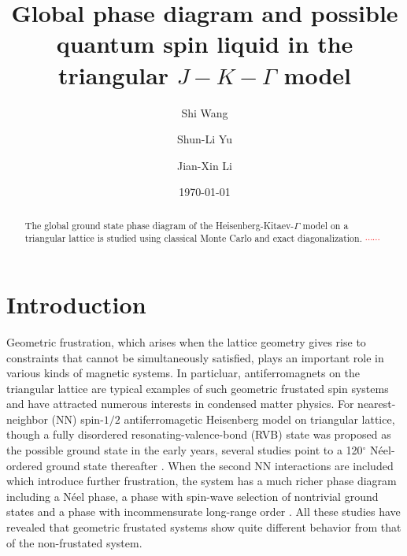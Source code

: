 \documentclass[aps,prb,reprint,groupedaddress,showpacs,amsfonts,amsmath,amssymb,superscriptaddress]{revtex4-1}
\begin{document}
\title{Global phase diagram and possible quantum spin liquid in the triangular $J-K-\Gamma$ model}

\author{Shi Wang}
\author{Shun-Li Yu}
\author{Jian-Xin Li}

\date{\today}

\begin{abstract}
    The global ground state phase diagram of the Heisenberg-Kitaev-$\Gamma$ model on a triangular lattice is studied using classical Monte Carlo and exact diagonalization. \textcolor{red}{$\cdots \cdots$}
\end{abstract}

\maketitle

\section{Introduction}
Geometric frustration, which arises when the lattice geometry gives rise to constraints that cannot be simultaneously satisfied, plays an important role in various kinds of magnetic systems. In particluar, antiferromagnets on the triangular lattice are typical examples of such geometric frustated spin systems and have attracted numerous interests in condensed matter physics. For nearest-neighbor (NN) spin-$1/2$ antiferromagetic Heisenberg model on triangular lattice, though a fully disordered resonating-valence-bond (RVB) \cite{Anderson1973} state was proposed as the possible ground state in the early years, several studies point to a 120$^\circ$ N\'{e}el-ordered ground state thereafter \cite{PhysRevLett.99.127004,PhysRevLett.82.3899,PhysRevB.50.10048,PhysRevLett.60.2531}. When the second NN interactions are included which introduce further frustration, the system has a much richer phase diagram including a N\'{e}el phase, a phase with spin-wave selection of nontrivial ground states and a phase with incommensurate long-range order \cite{PhysRevB.42.4800,PhysRevB.46.11137}. All these studies have revealed that geometric frustated systems show quite different behavior from that of the non-frustated system.
\end{document}

